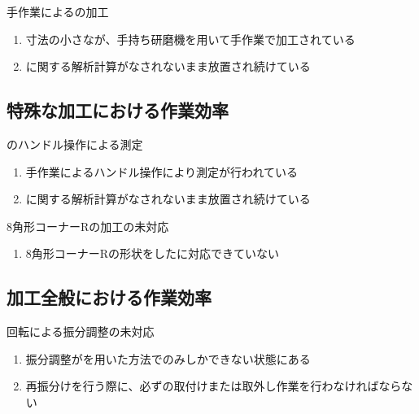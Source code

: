 \begin{Issues}{手作業による\EndFaceChamferMilling の加工}
\begin{enumerate}[label=\sarrow]
\item[{\sarrow[red]}]寸法の小さな\EndFaceChamferMilling が、手持ち研磨機を用いて手作業で加工されている
\item[{\sarrow[red]}]\EndFaceChamferMilling に関する解析計算がなされないまま放置され続けている
\end{enumerate}
\end{Issues}


\subsection{特殊な加工における作業効率}

\begin{Issues}{\CurvedOutcutMilling のハンドル操作による測定}
\begin{enumerate}[label=\sarrow]
\item[{\sarrow[red]}]手作業によるハンドル操作により測定が行われている
\item[{\sarrow[red]}]\CurvedOutcutMilling に関する解析計算がなされないまま放置され続けている
\end{enumerate}
\end{Issues}

\begin{Issues}{\Keyway 8角形コーナーRの加工の未対応}
\begin{enumerate}[label=\sarrow]
\item[{\sarrow[red]}]8角形コーナーRの形状をした\KeywayMilling に対応できていない
\end{enumerate}
\end{Issues}


\clearpage
\subsection{加工全般における作業効率}

\begin{Issues}{\Table 回転による振分調整の未対応}
\begin{enumerate}[label=\sarrow]
\item[{\sarrow[red]}]振分調整が\Spacer を用いた方法でのみしかできない状態にある
\item[{\sarrow[red]}]再振分けを行う際に、必ず\Spacer の取付けまたは取外し作業を行わなければならない
\end{enumerate}
\end{Issues}

